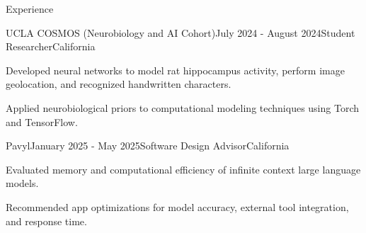 \documentclass[
  10pt, %
]{resume}
\begin{document}
\begin{rSection}{Experience}
  \begin{rSubsection}{UCLA COSMOS (Neurobiology and AI Cohort)}{July 2024 - August 2024}{Student Researcher}{California}
    
    \item Developed neural networks to model rat hippocampus activity, perform image geolocation, and recognized handwritten characters.
    
    \item Applied neurobiological priors to computational modeling techniques using Torch and TensorFlow.
    
  \end{rSubsection}
        
  \begin{rSubsection}{Pavyl}{January 2025 - May 2025}{Software Design Advisor}{California}
    
    \item Evaluated memory and computational efficiency of infinite context large language models.
    
    \item Recommended app optimizations for model accuracy, external tool integration, and response time.
    
  \end{rSubsection}
        
	
\end{rSection}

\end{document}
